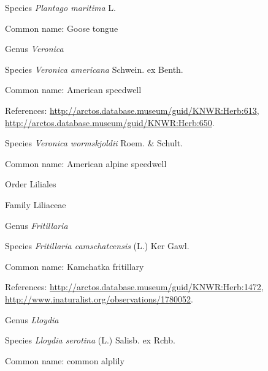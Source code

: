 \documentclass[9pt, article]{memoir}
\begin{document}
\begin{multicols}{2}
\vspace{6pt}\noindent\hspace{36pt}Species \textit{Plantago maritima} L.


Common name: Goose tongue

\vspace{6pt}\noindent\hspace{30pt}Genus \textit{Veronica}


\vspace{6pt}\noindent\hspace{36pt}Species \textit{Veronica americana} Schwein. ex Benth.


Common name: American speedwell

References: 
\url{http://arctos.database.museum/guid/KNWR:Herb:613}, 
\url{http://arctos.database.museum/guid/KNWR:Herb:650}.

\vspace{6pt}\noindent\hspace{36pt}Species \textit{Veronica wormskjoldii} Roem. \& Schult.


Common name: American alpine speedwell

\vspace{6pt}\noindent\hspace{18pt}Order Liliales


\vspace{6pt}\noindent\hspace{24pt}Family Liliaceae


\vspace{6pt}\noindent\hspace{30pt}Genus \textit{Fritillaria}


\vspace{6pt}\noindent\hspace{36pt}Species \textit{Fritillaria camschatcensis} (L.) Ker Gawl.


Common name: Kamchatka fritillary

References: 
\url{http://arctos.database.museum/guid/KNWR:Herb:1472}, 
\url{http://www.inaturalist.org/observations/1780052}.

\vspace{6pt}\noindent\hspace{30pt}Genus \textit{Lloydia}


\vspace{6pt}\noindent\hspace{36pt}Species \textit{Lloydia serotina} (L.) Salisb. ex Rchb.


Common name: common alplily


\end{multicols}
\end{document}
